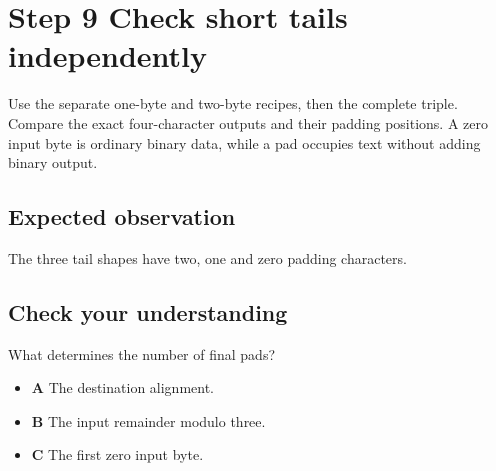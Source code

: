 \section{Step 9 Check short tails independently}\label{base64-s09}

Use the separate one-byte and two-byte recipes, then the complete triple. Compare the exact four-character outputs and their padding positions. A zero input byte is ordinary binary data, while a pad occupies text without adding binary output.

\subsection{Expected observation}
The three tail shapes have two, one and zero padding characters.

\subsection{Check your understanding}
What determines the number of final pads?

\begin{itemize}
  \item \textbf{A} The destination alignment.
  \item \textbf{B} The input remainder modulo three.
  \item \textbf{C} The first zero input byte.
\end{itemize}
